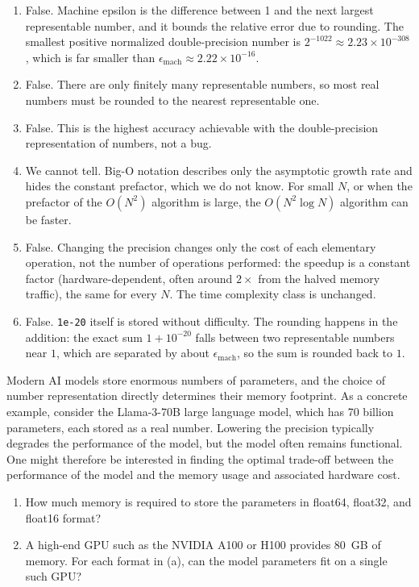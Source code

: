 \begin{solution}
    \begin{enumerate}[label=(\alph*)]
        \item False. Machine epsilon is the difference between 1 and the next largest representable number, and it bounds the relative error due to rounding. The smallest positive normalized double-precision number is $2^{-1022} \approx 2.23 \times 10^{-308}$, which is far smaller than $\epsilon_{\text{mach}} \approx 2.22 \times 10^{-16}$.
        \item False. There are only finitely many representable numbers, so most real numbers must be rounded to the nearest representable one.
        \item False. This is the highest accuracy achievable with the double-precision representation of numbers, not a bug.
        \item We cannot tell. Big-O notation describes only the asymptotic growth rate and hides the constant prefactor, which we do not know. For small $N$, or when the prefactor of the $O(N^2)$ algorithm is large, the $O(N^2 \log N)$ algorithm can be faster.
        \item False. Changing the precision changes only the cost of each elementary operation, not the number of operations performed: the speedup is a constant factor (hardware-dependent, often around $2\times$ from the halved memory traffic), the same for every $N$. The time complexity class is unchanged.
        \item False. \texttt{1e-20} itself is stored without difficulty. The rounding happens in the addition: the exact sum $1 + 10^{-20}$ falls between two representable numbers near $1$, which are separated by about $\epsilon_{\text{mach}}$, so the sum is rounded back to $1$.
    \end{enumerate}
\end{solution}

\begin{exercise}
    Modern AI models store enormous numbers of parameters, and the choice of number representation directly determines their memory footprint. As a concrete example, consider the Llama-3-70B large language model, which has 70 billion parameters, each stored as a real number.
    Lowering the precision typically degrades the performance of the model, but the model often remains functional.
    One might therefore be interested in finding the optimal trade-off between the performance of the model and the memory usage and associated hardware cost.
    \begin{enumerate}[label=(\alph*)]
        \item How much memory is required to store the parameters in float64, float32, and float16 format?
        \item A high-end GPU such as the NVIDIA A100 or H100 provides 80~GB of memory. For each format in (a), can the model parameters fit on a single such GPU?
    \end{enumerate}
\end{exercise}

